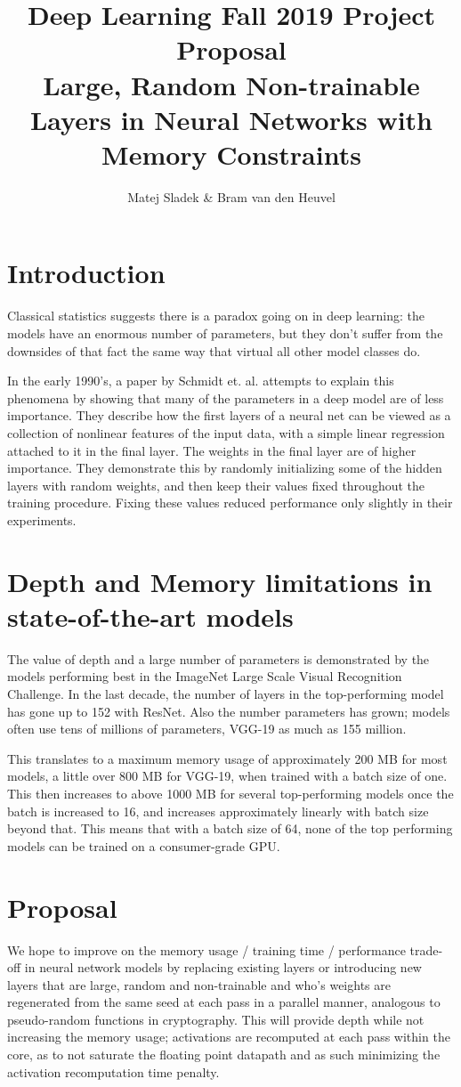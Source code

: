 \documentclass[]{article}
\title{Deep Learning Fall 2019 Project Proposal\\\large{Large, Random Non-trainable Layers in Neural Networks with Memory Constraints}}
\author{Matej Sladek \& Bram van den Heuvel}
\begin{document}
\maketitle

\section{Introduction}
Classical statistics suggests there is a paradox going on in deep learning: the models have an enormous number of parameters, but they don't suffer from the downsides of that fact the same way that virtual all other model classes do.

In the early 1990's, a paper by Schmidt et. al. attempts to explain this phenomena by showing that many of the parameters in a deep model are of less importance. They describe how the first layers of a neural net can be viewed as a collection of nonlinear features of the input data, with a simple linear regression attached to it in the final layer. The weights in the final layer are of higher importance. They demonstrate this by randomly initializing some of the hidden layers with random weights, and then keep their values fixed throughout the training procedure. Fixing these values reduced performance only slightly in their experiments.


\section{Depth and Memory limitations in state-of-the-art models}
The value of depth and a large number of parameters is demonstrated by the models performing best in the ImageNet Large Scale Visual Recognition Challenge. In the last decade, the number of layers in the top-performing model has gone up to 152 with ResNet. Also the number parameters has grown; models often use tens of millions of parameters, VGG-19 as much as 155 million.

This translates to a maximum memory usage of approximately 200 MB for most models, a little over 800 MB for VGG-19, when trained with a batch size of one. This then increases to above 1000 MB for several top-performing models once the batch is increased to 16, and increases approximately linearly with batch size beyond that. This means that with a batch size of 64, none of the top performing models can be trained on a consumer-grade GPU.

\section{Proposal}
We hope to improve on the memory usage / training time / performance trade-off in neural network models by replacing existing layers or introducing new layers that are large, random and non-trainable and who's weights are regenerated from the same seed at each pass in a parallel manner, analogous to pseudo-random functions in cryptography. This will provide depth while not increasing the memory usage; activations are recomputed at each pass within the core, as to not saturate the floating point datapath and as such minimizing the activation recomputation time penalty.
\end{document}
